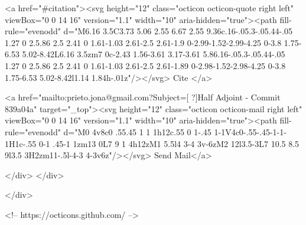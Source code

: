       <a  href="#citation"><svg height="12" class="octicon octicon-quote right left" viewBox="0 0 14 16" version="1.1" width="10" aria-hidden="true"><path fill-rule="evenodd" d="M6.16 3.5C3.73 5.06 2.55 6.67 2.55 9.36c.16-.05.3-.05.44-.05 1.27 0 2.5.86 2.5 2.41 0 1.61-1.03 2.61-2.5 2.61-1.9 0-2.99-1.52-2.99-4.25 0-3.8 1.75-6.53 5.02-8.42L6.16 3.5zm7 0c-2.43 1.56-3.61 3.17-3.61 5.86.16-.05.3-.05.44-.05 1.27 0 2.5.86 2.5 2.41 0 1.61-1.03 2.61-2.5 2.61-1.89 0-2.98-1.52-2.98-4.25 0-3.8 1.75-6.53 5.02-8.42l1.14 1.84h-.01z"/></svg> Cite
      </a>

      <a href="mailto:prieto.jona@gmail.com?Subject=[ ?]Half Adjoint - Commit 839a04a" target="_top"><svg height="12" class="octicon octicon-mail right left" viewBox="0 0 14 16" version="1.1" width="10" aria-hidden="true"><path fill-rule="evenodd" d="M0 4v8c0 .55.45 1 1 1h12c.55 0 1-.45 1-1V4c0-.55-.45-1-1-1H1c-.55 0-1 .45-1 1zm13 0L7 9 1 4h12zM1 5.5l4 3-4 3v-6zM2 12l3.5-3L7 10.5 8.5 9l3.5 3H2zm11-.5l-4-3 4-3v6z"/></svg> Send Mail</a>

    </div>
  </div>

</div>

<!-- https://octicons.github.com/ -->





